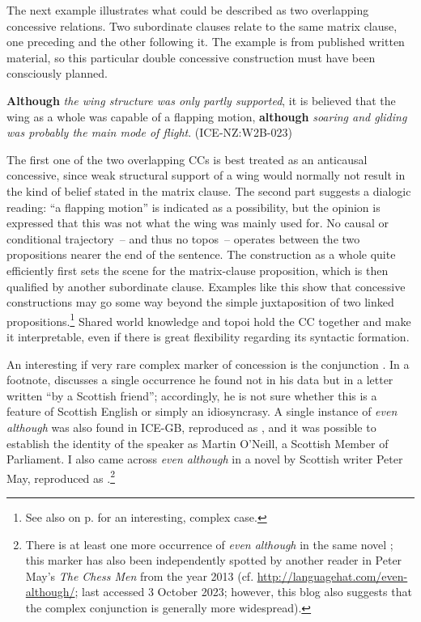 The next example illustrates what could be described as two overlapping concessive relations. Two subordinate clauses relate to the same matrix clause, one preceding and the other following it. The example is from published written material, so this particular double concessive construction must have been consciously planned.

\ea\label{ex:71}   \textbf{Although} \textit{the wing structure was only partly supported}, it is believed that the wing as a whole was capable of a flapping motion, \textbf{although} \textit{soaring and gliding was probably the main mode of flight}. (ICE-NZ:W2B-023)\\
\z

The first one of the two overlapping CCs is best treated as an anticausal concessive, since weak structural support of a wing would normally not result in the kind of belief stated in the matrix clause. The second part suggests a dialogic reading: “a flapping motion” is indicated as a possibility, but the opinion is expressed that this was not what the wing was mainly used for. No causal or conditional trajectory~– and thus no topos~– operates between the two propositions nearer the end of the sentence. The construction as a whole quite efficiently first sets the scene for the matrix-clause proposition, which is then qualified by another subordinate clause. Examples like this show that concessive construc\-tions may go some way beyond the simple juxtaposition of two linked propositions.\footnote{See also  on p. \pageref{bkm:Ref497554696} for an interesting, complex case.} Shared world knowledge and topoi hold the CC together and make it interpretable, even if there is great flexibility regarding its syntactic formation.

An interesting if very rare complex marker of concession is the conjunction . In a footnote, \citet[41]{Aarts1988} discusses a single occurrence he found not in his data but in a letter written “by a Scottish friend”; accordingly, he is not sure whether this is a feature of Scottish English or simply an idiosyncrasy. A single instance of \textit{even although} was also found in ICE-GB, reproduced as , and it was possible to establish the identity of the speaker as Martin O’Neill, a Scottish Member of Parliament. I also came across \textit{even although} in a novel by Scottish writer Peter May, reproduced as .\footnote{There is at least one more occurrence of \textit{even although} in the same novel \citep[369]{May2012}; this marker has also been independently spotted by another reader in Peter May’s \textit{The Chess Men} from the year 2013 (cf. \url{http://languagehat.com/even-although/}; last accessed 3 {October 2023}; however, this blog also suggests that the complex conjunction is generally more widespread).}


